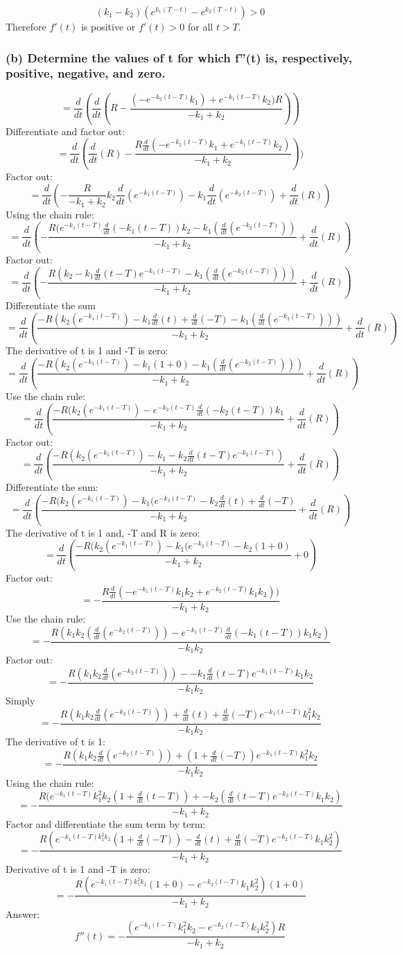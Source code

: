 \documentclass[]{article}
\begin{document}
\[(k_1 - k_2)(e^{k_1 (T-t)}-e^{k_2(T-t)})>0\] Therefore \(f'(t)\) is
positive or \(f'(t) > 0\) for all \(t > T\).

\subsubsection{(b) Determine the values of t for which f''(t) is,
respectively, positive, negative, and
zero.}\label{b-determine-the-values-of-t-for-which-ft-is-respectively-positive-negative-and-zero.}

\[=\frac{d}{dt}(\frac{d}{dt}(R - \frac{(-e^{-k_2(t-T)}k_1) + e^{-k_1(t-T)}k_2)R}{-k_1+k_2}))\]
Differentiate and factor out:
\[=\frac{d}{dt}(\frac{d}{dt}(R) - \frac{R \frac{d}{dt}(-e^{-k_2(t-T)}k_1 + e^{-k_1(t-T)}k_2)}{-k_1+k_2}))\]
Factor out:
\[=\frac{d}{dt}(-\frac{R}{-k_1 + k_2}k_2\frac{d}{dt}(e^{-k_1(t-T)})-k_1\frac{d}{dt}(e^{-k_2(t-T)})+\frac{d}{dt}(R))\]
Using the chain rule:
\[=\frac{d}{dt}(-\frac{R(e^{-k_1(t-T)}\frac{d}{dt}(-k_1(t-T))k_2 - k_1(\frac{d}{dt}(e^{-k_2(t-T)}))}{-k_1 +k_2}+\frac{d}{dt}(R))\]
Factor out:
\[= \frac{d}{dt}(-\frac{R(k_2-k_1 \frac{d}{dt}(t-T)e^{-k_1(t-T)}-k_1( \frac{d}{dt}(e^{-k_2(t-T)})))}{-k_1+k_2} + \frac{d}{dt}(R))\]
Differentiate the sum
\[=\frac{d}{dt}(\frac{-R(k_2(e^{-k_1(t-T)})-k_1\frac{d}{dt}(t)+\frac{d}{dt}(-T)-k_1(\frac{d}{dt}(e^{-k_2(t-T)})))}{-k_1+k_2}+\frac{d}{dt}(R))\]
The derivative of t is 1 and -T is zero:
\[=\frac{d}{dt}(\frac{-R(k_2(e^{-k_1(t-T)})-k_1(1+0)-k_1(\frac{d}{dt}(e^{-k_2(t-T)})))}{-k_1+k_2}+\frac{d}{dt}(R))\]
Use the chain rule:
\[=\frac{d}{dt}(\frac{-R(k_2(e^{-k_1(t-T)})-e^{-k_2(t-T)}\frac{d}{dt}(-k_2(t-T))k_1 }{-k_1+k_2}+\frac{d}{dt}(R))\]
Factor out:
\[=\frac{d}{dt}(\frac{-R(k_2(e^{-k_1(t-T)})-k_1-k_2\frac{d}{dt}(t-T)e^{-k_2(t-T)})  }{-k_1+k_2}+\frac{d}{dt}(R))\]
Differentiate the sum:
\[=\frac{d}{dt}(\frac{-R(k_2(e^{-k_1(t-T)})-k_1(e^{-k_2(t-T)}-k_2\frac{d}{dt}(t)+\frac{d}{dt}(-T)}{-k_1+k_2}+\frac{d}{dt}(R))\]
The derivative of t is 1 and, -T and R is zero:
\[=\frac{d}{dt}(\frac{-R(k_2(e^{-k_1(t-T)})-k_1(e^{-k_2(t-T)}-k_2(1+0)}{-k_1+k_2}+0)\]
Factor out:
\[=-\frac{R\frac{d}{dt}(-e^{-k_1(t-T)}k_1 k_2 + e^{-k_2(t-T)}k_1 k_2))}{-k_1 + k_2}\]
Use the chain rule:
\[=-\frac{R(k_1 k_2(\frac{d}{dt}(e^{-k_2(t-T)}))-e^{-k_1(t-T)}\frac{d}{dt}(-k_1(t-T))k_1 k_2)}{-k_1 k_2}\]
Factor out:
\[=-\frac{R(k_1 k_2 \frac{d}{dt}(e^{-k_2(t-T)}))--k_1\frac{d}{dt}(t-T)e^{-k_1(t-T)}k_1 k_2}{-k_1 k_2}\]
Simply
\[=-\frac{R(k_1 k_2 \frac{d}{dt}(e^{-k_2(t-T)}))+\frac{d}{dt}(t)+\frac{d}{dt}(-T)e^{-k_1(t-T)}k_1^2 k_2}{-k_1 k_2}\]
The derivative of t is 1:
\[=-\frac{R(k_1 k_2 \frac{d}{dt}(e^{-k_2(t-T)}))+(1+\frac{d}{dt}(-T))e^{-k_1(t-T)}k_1^2 k_2}{-k_1 k_2}\]
Using the chain rule:
\[=-\frac{R(e^{-k_1(t-T)}k_1^2k_2(1+\frac{d}{dt}(t-T))+-k_2(\frac{d}{dt}(t-T)e^{-k_2(t-T)}k_1 k_2)}{-k_1 + k_2}\]
Factor and differentiate the sum term by term:
\[=-\frac{R(e^{-k_1(t-T)k_1^2k_2}(1+\frac{d}{dt}(-T))- \frac{d}{dt}(t)+\frac{d}{dt}(-T)e^{-k_2(t-T)}k_1 k_2^2)}{-k_1 + k_2}\]
Derivative of t is 1 and -T is zero:
\[=-\frac{R(e^{-k_1(t-T)k_1^2k_2}(1+0)-e^{-k_2(t-T)}k_1 k_2^2)(1+0)}{-k_1 + k_2}\]
Answer:
\[f''(t) =-\frac{(e^{-k_1 (t-T)}k_1^2 k_2 -e^{-k_2(t-T)}k_1 k_2^2)R}{-k_1 + k_2}\]
\end{document}
